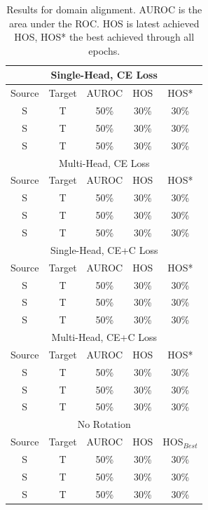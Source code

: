 \documentclass[10pt,twocolumn,letterpaper]{article}
\begin{document}
\begin{table}
  \centering
  \begin{tabular}[t]{||c|c|c||c|c||}
    \hline
    \multicolumn{5}{||c||}{Single-Head, CE Loss} \\
    \hline
    Source & Target & AUROC & HOS & HOS* \\
    S & T & 50\% & 30\% & 30\% \\
    S & T & 50\% & 30\% & 30\% \\
    S & T & 50\% & 30\% & 30\% \\
    \hline
    \hline
    \multicolumn{5}{||c||}{Multi-Head, CE Loss} \\
    \hline
    Source & Target & AUROC & HOS & HOS* \\
    S & T & 50\% & 30\% & 30\% \\
    S & T & 50\% & 30\% & 30\% \\
    S & T & 50\% & 30\% & 30\% \\
    \hline
    \hline
    \multicolumn{5}{||c||}{Single-Head, CE+C Loss} \\
    \hline
    Source & Target & AUROC & HOS & HOS* \\
    S & T & 50\% & 30\% & 30\% \\
    S & T & 50\% & 30\% & 30\% \\
    S & T & 50\% & 30\% & 30\% \\
    \hline
    \hline
    \multicolumn{5}{||c||}{Multi-Head, CE+C Loss} \\
    \hline
    Source & Target & AUROC & HOS & HOS* \\
    S & T & 50\% & 30\% & 30\% \\
    S & T & 50\% & 30\% & 30\% \\
    S & T & 50\% & 30\% & 30\% \\
    \hline 
    \hline
    \multicolumn{5}{||c||}{No Rotation} \\
    \hline
    Source & Target & AUROC & HOS & HOS$_{Best}$ \\
    S & T & 50\% & 30\% & 30\% \\
    S & T & 50\% & 30\% & 30\% \\
    S & T & 50\% & 30\% & 30\% \\
    \hline
  \end{tabular}
  \caption{\centering\label{tab:results}Results for domain alignment. AUROC is the area under the ROC. HOS is latest achieved HOS, HOS* the best achieved through all epochs.}
\end{table}
\end{document}
